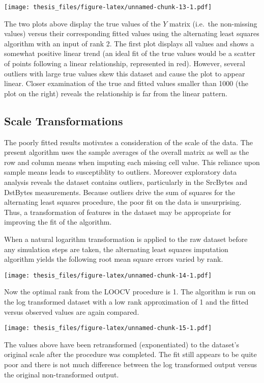 \documentclass[12pt,twoside]{dukestatscithesis}
\theoremstyle{definition}
\theoremstyle{definition}
\theoremstyle{definition}
\theoremstyle{remark}
\begin{document}
\texttt{[image: thesis\_files/figure-latex/unnamed-chunk-13-1.pdf]}

The two plots above display the true values of the \(Y\) matrix
(i.e.~the non-missing values) versus their corresponding fitted values
using the alternating least squares algorithm with an input of rank 2.
The first plot displays all values and shows a somewhat positive linear
trend (an ideal fit of the true values would be a scatter of points
following a linear relationship, represented in red). However, several
outliers with large true values skew this dataset and cause the plot to
appear linear. Closer examination of the true and fitted values smaller
than 1000 (the plot on the right) reveals the relationship is far from
the linear pattern.

\subsection{Scale Transformations}\label{scale-transformations}

The poorly fitted results motivates a consideration of the scale of the
data. The present algorithm uses the sample averages of the overall
matrix as well as the row and column means when imputing each missing
cell value. This reliance upon sample means leads to susceptiblity to
outliers. Moreover exploratory data analysis reveals the dataset
contains outliers, particularly in the SrcBytes and DstBytes
measurements. Because outliers drive the sum of squares for the
alternating least squares procedure, the poor fit on the data is
unsurprising. Thus, a transformation of features in the dataset may be
appropriate for improving the fit of the algorithm.

When a natural logarithm transformation is applied to the raw dataset
before any simulation steps are taken, the alternating least squares
imputation algorithm yields the following root mean square errors varied
by rank.

\texttt{[image: thesis\_files/figure-latex/unnamed-chunk-14-1.pdf]}

Now the optimal rank from the LOOCV procedure is 1. The algorithm is run
on the log transformed dataset with a low rank approximation of 1 and
the fitted versus observed values are again compared.

\texttt{[image: thesis\_files/figure-latex/unnamed-chunk-15-1.pdf]}

The values above have been retransformed (exponentiated) to the
dataset's original scale after the procedure was completed. The fit
still appears to be quite poor and there is not much difference between
the log transformed output versus the original non-transformed output.
\end{document}
